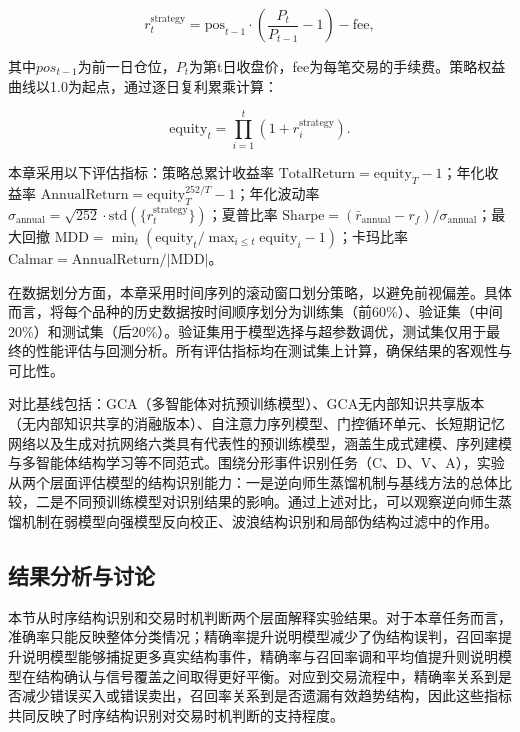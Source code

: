 \begin{equation}
r_t^{\text{strategy}} = \text{pos}_{t-1} \cdot \left(\frac{P_t}{P_{t-1}} - 1\right) - \text{fee},
\end{equation}

其中$pos_{t-1}$为前一日仓位，$P_t$为第t日收盘价，fee为每笔交易的手续费。策略权益曲线以1.0为起点，通过逐日复利累乘计算：

\begin{equation}
\text{equity}_t = \prod_{i=1}^{t}\left(1 + r_i^{\text{strategy}}\right).
\end{equation}

本章采用以下评估指标：策略总累计收益率 $\text{TotalReturn} = \text{equity}_T - 1$；年化收益率 $\text{AnnualReturn} = \text{equity}_T^{252/T} - 1$；年化波动率 $\sigma_{\text{annual}} = \sqrt{252} \cdot \text{std}(\{r_t^{\text{strategy}}\})$；夏普比率 $\text{Sharpe} = (\bar{r}_{\text{annual}} - r_f) / \sigma_{\text{annual}}$；最大回撤 $\text{MDD} = \min_t\left(\text{equity}_t / \max_{i\le t}\text{equity}_i - 1\right)$；卡玛比率 $\text{Calmar} = \text{AnnualReturn} / |\text{MDD}|$。

在数据划分方面，本章采用时间序列的滚动窗口划分策略，以避免前视偏差。具体而言，将每个品种的历史数据按时间顺序划分为训练集（前60\%）、验证集（中间20\%）和测试集（后20\%）。验证集用于模型选择与超参数调优，测试集仅用于最终的性能评估与回测分析。所有评估指标均在测试集上计算，确保结果的客观性与可比性。

对比基线包括：GCA（多智能体对抗预训练模型）、GCA无内部知识共享版本（无内部知识共享的消融版本）、自注意力序列模型、门控循环单元、长短期记忆网络以及生成对抗网络六类具有代表性的预训练模型，涵盖生成式建模、序列建模与多智能体结构学习等不同范式。围绕分形事件识别任务（C、D、V、A），实验从两个层面评估模型的结构识别能力：一是逆向师生蒸馏机制与基线方法的总体比较，二是不同预训练模型对识别结果的影响。通过上述对比，可以观察逆向师生蒸馏机制在弱模型向强模型反向校正、波浪结构识别和局部伪结构过滤中的作用。

\subsection{结果分析与讨论}
本节从时序结构识别和交易时机判断两个层面解释实验结果。对于本章任务而言，准确率只能反映整体分类情况；精确率提升说明模型减少了伪结构误判，召回率提升说明模型能够捕捉更多真实结构事件，精确率与召回率调和平均值提升则说明模型在结构确认与信号覆盖之间取得更好平衡。对应到交易流程中，精确率关系到是否减少错误买入或错误卖出，召回率关系到是否遗漏有效趋势结构，因此这些指标共同反映了时序结构识别对交易时机判断的支持程度。

